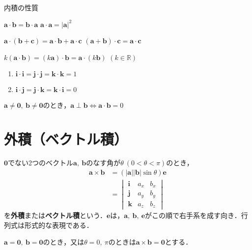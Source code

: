 \begin{kousiki}{内積の性質}
	\begin{enumerate}[label=\textbf{[\arabic*]}, labelsep=10pt, leftmargin=23pt]
		\item $\bm{a} \cdot \bm{b} = \bm{b} \cdot \bm{a}$ \qquad $\bm{a} \cdot \bm{a} = |\bm{a}|^2$
		\item $\bm{a} \cdot (\bm{b} + \bm{c}) = \bm{a} \cdot \bm{b} + \bm{a} \cdot \bm{c}$ \qquad $(\bm{a} + \bm{b}) \cdot \bm{c} = \bm{a} \cdot \bm{c}$
		\item $k(\bm{a} \cdot \bm{b}) = (k\bm{a}) \cdot \bm{b} = \bm{a} \cdot (k\bm{b})$ \qquad $(k \in \mathbb{R})$
		\item
			\begin{enumerate}[label=(\roman*), labelsep=10pt, leftmargin=23pt]
				\item $\bm{i} \cdot \bm{i} = \bm{j} \cdot \bm{j} = \bm{k} \cdot \bm{k} = 1$
				\item $\bm{i} \cdot \bm{j} = \bm{j} \cdot \bm{k} = \bm{k} \cdot \bm{i} = 0$
			\end{enumerate}
		\item $\bm{a} \ne \bm{0},\ \bm{b} \ne \bm{0}$のとき，$\bm{a} \perp \bm{b} \iff \bm{a} \cdot \bm{b} = 0$
	\end{enumerate}
	
\end{kousiki}



\section{外積（ベクトル積）}

$\bm{0}$でない2つのベクトル$\bm{a},\ \bm{b}$のなす角が$\theta\ (0 < \theta < \pi)$のとき，
\begin{align}
	\bm{a} \times \bm{b} &= (|\bm{a}||\bm{b}|\sin\theta)\bm{e}\\
	&= 
	\begin{vmatrix}
		\bm{i} & a_x & b_x\\
		\bm{j} & a_y & b_y\\
		\bm{k} & a_z & b_z
	\end{vmatrix}
\end{align}
を\textbf{外積}または\textbf{ベクトル積}という．$\bm{e}$は，$\bm{a},\ \bm{b},\ \bm{e}$がこの順で右手系を成す向き．行列式は形式的な表現である．

$\bm{a} = \bm{0},\ \bm{b} = \bm{0}$のとき，又は$\theta = 0,\ \pi$のときは$\bm{a} \times \bm{b} = \bm{0}$とする．

